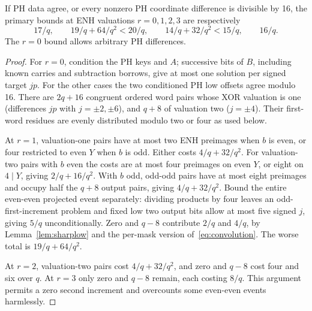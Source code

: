 \begin{lemma}\label{lem:smallblock}
If PH data agree, or every nonzero PH coordinate difference is divisible by 16, the primary bounds at ENH valuations $r=0,1,2,3$ are respectively
\[
 17/q,\qquad19/q+64/q^2<20/q,\qquad14/q+32/q^2<15/q,\qquad16/q.
\]
The $r=0$ bound allows arbitrary PH differences.
\end{lemma}
\begin{proof}
For $r=0$, condition the PH keys and $A$; successive bits of $B$, including known carries and subtraction borrows, give at most one solution per signed target $jp$.
For the other cases the two conditioned PH low offsets agree modulo 16. There are $2q+16$ congruent ordered word pairs whose XOR valuation is one (differences $jp$ with $j=\pm2,\pm6$), and $q+8$ of valuation two ($j=\pm4$). Their first-word residues are evenly distributed modulo two or four as used below.

At $r=1$, valuation-one pairs have at most two ENH preimages when $b$ is even, or four restricted to even $Y$ when $b$ is odd. Either costs $4/q+32/q^2$. For valuation-two pairs with $b$ even the costs are at most four preimages on even $Y$, or eight on $4\mid Y$, giving $2/q+16/q^2$. With $b$ odd, odd-odd pairs have at most eight preimages and occupy half the $q+8$ output pairs, giving $4/q+32/q^2$. Bound the entire even-even projected event separately: dividing products by four leaves an odd-first-increment problem and fixed low two output bits allow at most five signed $j$, giving $5/q$ unconditionally. Zero and $q-8$ contribute $2/q$ and $4/q$, by Lemma~\ref{lem:sharplow} and the per-mask version of~\eqref{eq:convolution}. The worse total is $19/q+64/q^2$.

At $r=2$, valuation-two pairs cost $4/q+32/q^2$, and zero and $q-8$ cost four and six over $q$. At $r=3$ only zero and $q-8$ remain, each costing $8/q$. This argument permits a zero second increment and overcounts some even-even events harmlessly.
\end{proof}

